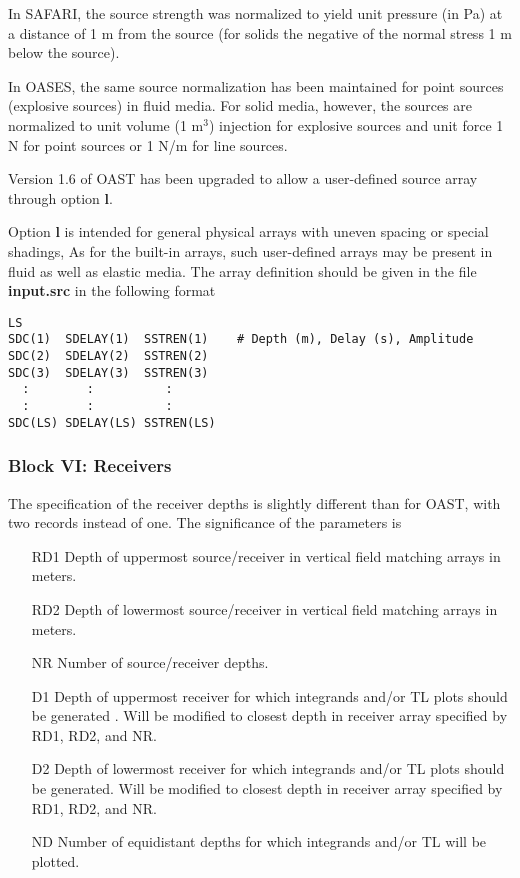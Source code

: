 
    In  SAFARI,  the source strength was normalized to yield unit
pressure (in Pa) 
at a distance of 1 m from the source (for 
solids the negative of the normal stress 1 m below the source). 

    In  OASES, the same source normalization has been  maintained 
for point sources (explosive sources) in fluid media.
    For solid media, however, the sources are normalized to  unit 
volume (1 m$^3$) injection for explosive sources and unit force 
1 N for point sources or 1 N/m for line sources.

\label{rdoastsou}

Version 1.6 of OAST has been upgraded to allow a user-defined source
array through option {\bf l}. 

Option {\bf l} is intended
for general physical arrays with uneven spacing or special shadings,
As for the built-in arrays, such user-defined arrays may be present in
fluid as well as elastic media. The array definition should be given
in the file {\bf input.src} in the following format

\small
\begin{verbatim}
LS
SDC(1)  SDELAY(1)  SSTREN(1)    # Depth (m), Delay (s), Amplitude
SDC(2)  SDELAY(2)  SSTREN(2) 
SDC(3)  SDELAY(3)  SSTREN(3) 
  :        :          :
  :        :          :
SDC(LS) SDELAY(LS) SSTREN(LS) 
\end{verbatim}
\normalsize

\subsubsection{Block VI: Receivers}

The specification of the receiver depths is slightly different than
for OAST, with two records instead of one.
The significance of the parameters is
\begin{itemize}
\item[RD1]  Depth of uppermost source/receiver in vertical field
matching arrays in meters. 
\item[RD2]  Depth of lowermost source/receiver in vertical field
matching arrays in meters. 
\item[NR] Number of source/receiver depths. 
\item[D1]   Depth of uppermost receiver for which integrands and/or TL
plots should be generated . Will be modified to closest depth in
receiver array specified by RD1, RD2, and NR.
\item[D2]   Depth of lowermost receiver for which integrands and/or TL
plots should be generated. Will be modified to closest depth in
receiver array specified by RD1, RD2, and NR.
\item[ND] Number of equidistant depths for which integrands and/or TL
will be plotted.
\end{itemize}

